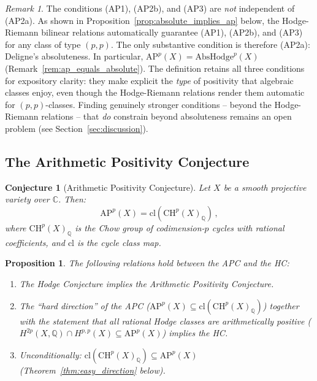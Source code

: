 \documentclass[aps,prd,twocolumn,superscriptaddress,nofootinbib]{revtex4-2}
\newtheorem{proposition}[theorem]{Proposition}
\newtheorem{conjecture}[theorem]{Conjecture}
\theoremstyle{definition}
\theoremstyle{remark}
\newtheorem{remark}[theorem]{Remark}
\begin{document}
\begin{remark}
\label{rem:redundancy}
The conditions (AP1), (AP2b), and (AP3) are \textit{not} independent of (AP2a). As shown in Proposition~\ref{prop:absolute_implies_ap} below, the Hodge-Riemann bilinear relations automatically guarantee (AP1), (AP2b), and (AP3) for any class of type $(p,p)$. The only substantive condition is therefore (AP2a): Deligne's absoluteness. In particular, $\mathrm{AP}^p(X) = \mathrm{AbsHodge}^p(X)$ (Remark~\ref{rem:ap_equals_absolute}). The definition retains all three conditions for expository clarity: they make explicit the \textit{type} of positivity that algebraic classes enjoy, even though the Hodge-Riemann relations render them automatic for $(p,p)$-classes. Finding genuinely stronger conditions -- beyond the Hodge-Riemann relations -- that \textit{do} constrain beyond absoluteness remains an open problem (see Section~\ref{sec:discussion}).
\end{remark}

\subsection{The Arithmetic Positivity Conjecture}

\begin{conjecture}[Arithmetic Positivity Conjecture]
\label{conj:AP}
Let $X$ be a smooth projective variety over $\mathbb{C}$. Then:
\begin{equation}
\mathrm{AP}^p(X) = \mathrm{cl}\!\left(\mathrm{CH}^p(X)_\mathbb{Q}\right)\,,
\end{equation}
where $\mathrm{CH}^p(X)_\mathbb{Q}$ is the Chow group of codimension-$p$ cycles with rational coefficients, and $\mathrm{cl}$ is the cycle class map.
\end{conjecture}

\begin{proposition}
\label{prop:equivalence}
The following relations hold between the APC and the HC:
\begin{enumerate}
\item The Hodge Conjecture implies the Arithmetic Positivity Conjecture.
\item The ``hard direction'' of the APC ($\mathrm{AP}^p(X) \subseteq \mathrm{cl}(\mathrm{CH}^p(X)_\mathbb{Q})$) together with the statement that all rational Hodge classes are arithmetically positive ($H^{2p}(X, \mathbb{Q}) \cap H^{p,p}(X) \subseteq \mathrm{AP}^p(X)$) implies the HC.
\item Unconditionally: $\mathrm{cl}(\mathrm{CH}^p(X)_\mathbb{Q}) \subseteq \mathrm{AP}^p(X)$ (Theorem~\ref{thm:easy_direction} below).
\end{enumerate}
\end{proposition}
\end{document}
